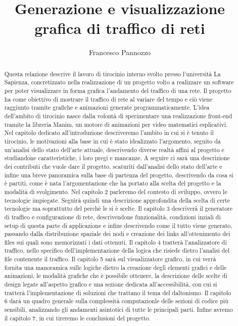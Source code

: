 \documentclass[binding=0.6cm]{sapthesis}
\title{Generazione e visualizzazione grafica di traffico di reti}
\author{Francesco Pannozzo}
\begin{document}
\frontmatter
\maketitle
\dedication{Dedicato alla\\ mia famiglia}
\begin{abstract}
Questa relazione descrive il lavoro di tirocinio interno svolto presso l'università La Sapienza, 
concretizzato nella realizzazione 
di un progetto volto a realizzare un software per poter visualizzare in forma grafica l'andamento 
del traffico di una rete.
Il progetto ha come obiettivo di mostrare il traffico di rete al variare del tempo e ciò viene raggiunto
tramite grafiche e animazioni generate programmaticamente. L'idea dell'ambito di tirocinio nasce 
dalla volontà di sperimentare una realizzazione front-end tramite la libreria Manim, un motore di animazioni per video
matematici esplicativi. Nel capitolo dedicato all'introduzione descriveremo l'ambito in cui si è tenuto il tirocinio, le motivazioni
alla base in cui è stato idealizzato l'argomento, seguito da un'analisi dello stato dell'arte attuale, descrivendo diverse realtà affini al progetto
e studiandone caratteristiche, i loro pregi e mancanze. A seguire ci sarà una descrizione dei contributi che vuole dare il progetto, scaturiti dall'analisi
dello stato dell'arte e infine una breve panoramica sulla base di partenza del progetto, descrivendo da cosa si è partiti, come è nata l'argomentazione
che ha portato alla scelta del progetto e la modalità di svolgimento. Nel capitolo 2 parleremo del contesto di sviluppo, ovvero le tecnologie impiegate.
Seguirà quindi una descrizione approfondita della scelta di certe tecnologie ma soprattutto del perchè le si è scelte. Il capitolo 3
descriverà il generatore di traffico e configurazione di rete, descrivendone funzionalità, condizioni inziali di setup di questa parte di applicazione e infine
descrivendo come il tutto viene generato, passando dalla distribuzione spaziale dei nodi e creazione dei links all'ottenimento dei files sui quali sono memorizzati i dati ottenuti.
Il capitolo 4 tratterà l'analizzatore di traffico, nello specifico dell'implementazione della logica che risiede dietro l'analisi del file contenente il traffico.
Il capitolo 5 sarà sul visualizzatore grafico, in cui verrà fornita una manoramica sulle logiche dietro la creazione degli elementi grafici e delle animazioni, le modalità
grafiche che è possibile ottenere, la descrizione delle scelte di design legate all'aspetto grafico e una sezione dedicata all'accessibilità, con cui si tratterà
l'implementazione di soluzioni che trattano il tema del daltonismo. Il capitolo 6 darà un quadro generale sulla complessità computazionle delle sezioni di codice più sensibili, analizzando gli andamenti asintotici di tutte le principali parti.
Infine avremo il capitolo 7, in cui tireremo le conclusioni del progetto.

\end{abstract}
\tableofcontents
\mainmatter
\end{document}
